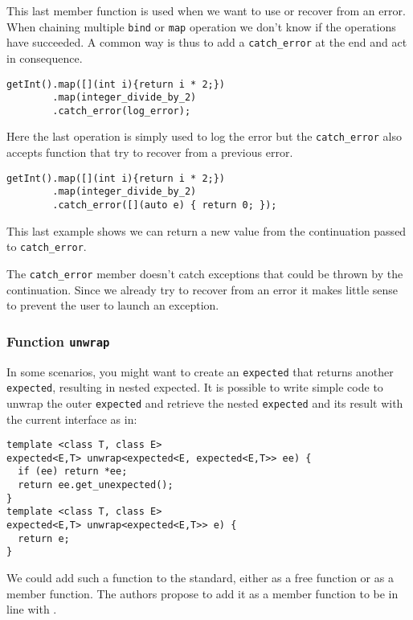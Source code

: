 \documentclass[a4paper,10pt]{article}
\newcommand{\cpp}[1]{\lstinline{#1}}
\begin{document}
This last member function is used when we want to use or recover from an error. When chaining multiple \cpp{bind} or \cpp{map} operation we don't know if the operations have succeeded. A common way is thus to add a \cpp{catch_error} at the end and act in consequence.

\begin{lstlisting}
getInt().map([](int i){return i * 2;})
        .map(integer_divide_by_2)
        .catch_error(log_error);
\end{lstlisting}

Here the last operation is simply used to log the error but the \cpp{catch_error} also accepts function that try to recover from a previous error.

\begin{lstlisting}
getInt().map([](int i){return i * 2;})
        .map(integer_divide_by_2)
        .catch_error([](auto e) { return 0; });
\end{lstlisting}
\noindent
This last example shows we can return a new value from the continuation passed to \cpp{catch_error}.
\newline

The \cpp{catch_error} member doesn't catch exceptions that could be thrown by the continuation. Since we already try to recover from an error it makes little sense to prevent the user to launch an exception.

\subsubsection{Function \cpp{unwrap}}

In some scenarios, you might want to create an \cpp{expected} that returns another \cpp{expected}, resulting in nested expected. It is possible to write simple code to unwrap the outer \cpp{expected} and retrieve the nested \cpp{expected} and its result with the current interface as in:

\begin{lstlisting}
template <class T, class E>
expected<E,T> unwrap<expected<E, expected<E,T>> ee) {
  if (ee) return *ee;
  return ee.get_unexpected();
}
template <class T, class E>
expected<E,T> unwrap<expected<E,T>> e) {
  return e;
}
\end{lstlisting}

We could add such a function to the standard, either as a free function or as a member function. The authors propose to add it as a member function to be in line with \cite{ImprovementsAsync}.
\end{document}
